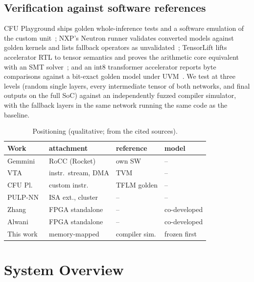 \documentclass[journal]{IEEEtran}
\begin{document}
\subsection{Verification against software references}
CFU Playground ships golden whole-inference tests and a software emulation of the custom unit~\cite{prakash2023cfu}; NXP's Neutron runner validates converted models against golden kernels and lists fallback operators as unvalidated~\cite{nxp_neutron_runner}; TensorLift lifts accelerator RTL to tensor semantics and proves the arithmetic core equivalent with an SMT solver~\cite{gao2026tensorlift}; and an int8 transformer accelerator reports byte comparisons against a bit-exact golden model under UVM~\cite{shashank2026tfa}. We test at three levels (random single layers, every intermediate tensor of both networks, and final outputs on the full SoC) against an independently fuzzed compiler simulator, with the fallback layers in the same network running the same code as the baseline.

\begin{table}[t]\centering
\caption{Positioning (qualitative; from the cited sources).}\label{tab:position}
\footnotesize\setlength{\tabcolsep}{3pt}
\begin{tabular}{llll}\toprule
Work & attachment & reference & model\\\midrule
Gemmini~\cite{genc2021gemmini} & RoCC (Rocket) & own SW & --\\
VTA~\cite{moreau2018vta} & instr.\ stream, DMA & TVM & --\\
CFU Pl.~\cite{prakash2023cfu} & custom instr. & TFLM golden & --\\
PULP-NN~\cite{garofalo2019pulpnn} & ISA ext., cluster & -- & --\\
Zhang~\cite{zhang2015optimizing} & FPGA standalone & -- & co-developed\\
Alwani~\cite{alwani2016fused} & FPGA standalone & -- & co-developed\\
This work & memory-mapped & compiler sim. & frozen first\\\bottomrule
\end{tabular}
\end{table}

\section{System Overview}\label{sec:system}
\end{document}
